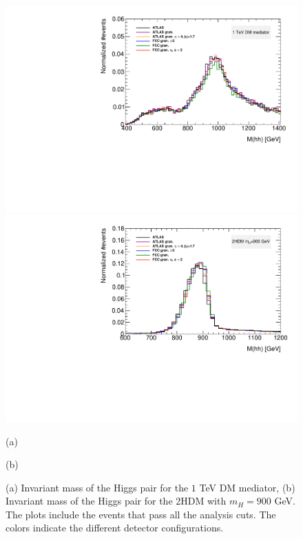\begin{figure}
	\centering
	\begin{minipage}[t]{.5\textwidth}
		\centering
		\includegraphics[trim={.55cm 0 0 0},clip,width=\linewidth]{./Figures/MhhX_after.pdf}
	\end{minipage}%
	\begin{minipage}[t]{.5\textwidth}
		\centering
		\includegraphics[trim={0 0 .55cm 0},clip,width=\linewidth]{./Figures/Mhh2HDM_after.pdf}
	\end{minipage}
	
	\begin{minipage}[t]{0.5\textwidth}
		\caption*{(a)}
	\end{minipage}%
	\hfill
	\begin{minipage}[t]{0.5\textwidth}
		\caption*{(b)}
	\end{minipage}
	
	\caption{(a) Invariant mass of the Higgs pair for the $1$ TeV DM mediator, (b) Invariant mass of the Higgs pair for the 2HDM with $m_H=900$ GeV. The plots include the events that pass all the analysis cuts. The colors indicate the different detector configurations.}
	\label{fig:CompGran1}
\end{figure}

